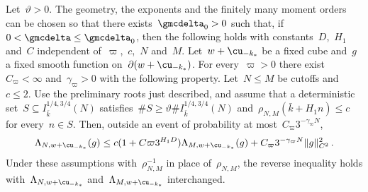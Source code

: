 \documentclass[11pt]{amsart}
\begin{document}
\begin{lemma}
\label{mfd:lem-finite-stopping}
Let~$\vartheta>0$. The geometry, the exponents and the finitely many moment orders can be chosen so that there exists~$\gmcdelta_0>0$ such that, if~$0<\gmcdelta\leq\gmcdelta_0$, then the following holds with constants~$D$,~$H_1$ and~$C$ independent of~$\varpi$,~$c$,~$N$ and~$M$. Let~$w+\cu_{-k_*}$ be a fixed cube and~$g$ a fixed smooth function on~$\partial(w+\cu_{-k_*})$. For every~$\varpi>0$ there exist~$C_\varpi<\infty$ and~$\gamma_\varpi>0$ with the following property. Let~$N\leq M$ be cutoffs and~$c\leq2$. Use the preliminary roots just described, and assume that a deterministic set~$S\subseteq I_{\bar k}^{1/4,3/4}(N)$ satisfies~$\#S\geq\vartheta\#I_{\bar k}^{1/4,3/4}(N)$ and~$\rho_{N,M}(\bar k+H_1n)\leq c$ for every~$n\in S$. Then, outside an event of probability at most~$C_\varpi3^{-\gamma_\varpi N}$,
\begin{equation*}
	\Lambda_{N,w+\cu_{-k_*}}(g)
	\leq c(1+C\varpi3^{H_1D})\Lambda_{M,w+\cu_{-k_*}}(g)
	+C_\varpi3^{-\gamma_\varpi N}\|g\|_{C^2}^2\,.
\end{equation*}
Under these assumptions with~$\rho_{N,M}^{-1}$ in place of~$\rho_{N,M}$, the reverse inequality holds with~$\Lambda_{N,w+\cu_{-k_*}}$ and~$\Lambda_{M,w+\cu_{-k_*}}$ interchanged.
\end{lemma}
\end{document}
